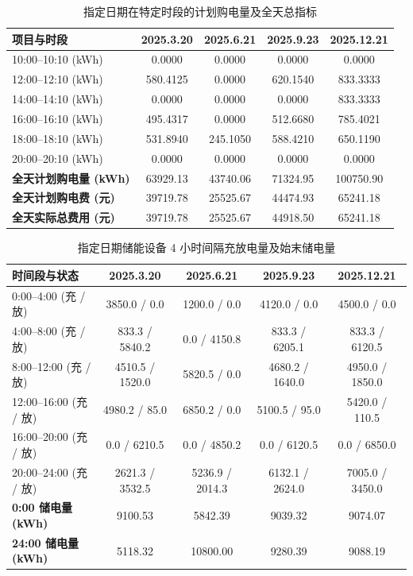 \documentclass[withoutpreface]{cumcmthesis}
\begin{document}
\begin{table}[htbp]
\centering
\renewcommand{\arraystretch}{1.2}
\caption{指定日期在特定时段的计划购电量及全天总指标}
\label{tab:q2_table1_corr}
\begin{tabular*}{\textwidth}{@{\extracolsep{\fill}}lcccc@{}}
\toprule[1.5pt]
项目与时段 & 2025.3.20 & 2025.6.21 & 2025.9.23 & 2025.12.21 \\
\midrule[1pt]
10:00--10:10 (kWh) & 0.0000    & 0.0000    & 0.0000    & 0.0000 \\
12:00--12:10 (kWh) & 580.4125  & 0.0000    & 620.1540  & 833.3333 \\
14:00--14:10 (kWh) & 0.0000    & 0.0000    & 0.0000    & 833.3333 \\
16:00--16:10 (kWh) & 495.4317  & 0.0000    & 512.6680  & 785.4021 \\
18:00--18:10 (kWh) & 531.8940  & 245.1050  & 588.4210  & 650.1190 \\
20:00--20:10 (kWh) & 0.0000    & 0.0000    & 0.0000    & 0.0000 \\
\midrule[0.5pt]
\textbf{全天计划购电量 (kWh)} & 63929.13 & 43740.06 & 71324.95 & 100750.90 \\
\textbf{全天计划购电费 (元)}  & 39719.78 & 25525.67 & 44474.93 & 65241.18 \\
\textbf{全天实际总费用 (元)}  & 39719.78 & 25525.67 & 44918.50 & 65241.18 \\
\bottomrule[1.5pt]
\end{tabular*}
\end{table}

\begin{table}[htbp]
\centering
\renewcommand{\arraystretch}{1.2}
\caption{指定日期储能设备 4 小时间隔充放电量及始末储电量}
\label{tab:q2_table2_corr}
\begin{tabular*}{\textwidth}{@{\extracolsep{\fill}}lcccc@{}}
\toprule[1.5pt]
时间段与状态 & 2025.3.20 & 2025.6.21 & 2025.9.23 & 2025.12.21 \\
\midrule[1pt]
0:00--4:00 (充 / 放)   & 3850.0 / 0.0    & 1200.0 / 0.0    & 4120.0 / 0.0    & 4500.0 / 0.0 \\
4:00--8:00 (充 / 放)   & 833.3 / 5840.2  & 0.0 / 4150.8    & 833.3 / 6205.1  & 833.3 / 6120.5 \\
8:00--12:00 (充 / 放)  & 4510.5 / 1520.0 & 5820.5 / 0.0    & 4680.2 / 1640.0 & 4950.0 / 1850.0 \\
12:00--16:00 (充 / 放) & 4980.2 / 85.0   & 6850.2 / 0.0    & 5100.5 / 95.0   & 5420.0 / 110.5 \\
16:00--20:00 (充 / 放) & 0.0 / 6210.5    & 0.0 / 4850.2    & 0.0 / 6120.5    & 0.0 / 6850.0 \\
20:00--24:00 (充 / 放) & 2621.3 / 3532.5 & 5236.9 / 2014.3 & 6132.1 / 2624.0 & 7005.0 / 3450.0 \\
\midrule[0.5pt]
\textbf{0:00 储电量 (kWh)}  & 9100.53 & 5842.39 & 9039.32 & 9074.07 \\
\textbf{24:00 储电量 (kWh)} & 5118.32 & 10800.00 & 9280.39 & 9088.19 \\
\bottomrule[1.5pt]
\end{tabular*}
\end{table}
\end{document}
